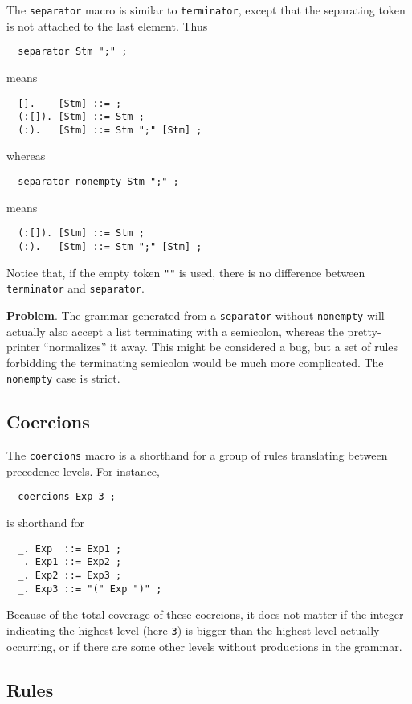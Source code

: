 \documentclass[10pt]{article}
\begin{document}
The \verb$separator$ macro is similar to \verb$terminator$,
except that the separating token is not attached to the last
element. Thus
\begin{verbatim}
  separator Stm ";" ;
\end{verbatim}
means
\begin{verbatim}
  [].    [Stm] ::= ;
  (:[]). [Stm] ::= Stm ;
  (:).   [Stm] ::= Stm ";" [Stm] ;
\end{verbatim}
whereas
\begin{verbatim}
  separator nonempty Stm ";" ;
\end{verbatim}
means
\begin{verbatim}
  (:[]). [Stm] ::= Stm ;
  (:).   [Stm] ::= Stm ";" [Stm] ;
\end{verbatim}
Notice that, if the empty token \verb$""$ is used, there
is no difference between \verb$terminator$ and \verb$separator$.




{\bf Problem}.
The grammar generated from
a \verb$separator$ without \verb$nonempty$
will actually
also accept a list terminating with a semicolon, whereas
the pretty-printer ``normalizes'' it away. This might be considered
a bug, but a set of rules
forbidding the terminating semicolon would be much more
complicated. The \verb$nonempty$ case is strict.



\subsection{Coercions}
\label{coercions}

The \verb$coercions$ macro is a shorthand for a group of rules
translating between precedence levels. For instance,
\begin{verbatim}
  coercions Exp 3 ;
\end{verbatim}
is shorthand for
\begin{verbatim}
  _. Exp  ::= Exp1 ;
  _. Exp1 ::= Exp2 ;
  _. Exp2 ::= Exp3 ;
  _. Exp3 ::= "(" Exp ")" ;
\end{verbatim}
Because of the total coverage of these coercions,
it does not matter if the integer indicating the highest level
(here \verb$3$) is bigger than the highest level actually occurring,
or if there are some other levels without productions in the grammar.



\subsection{Rules}
\end{document}
